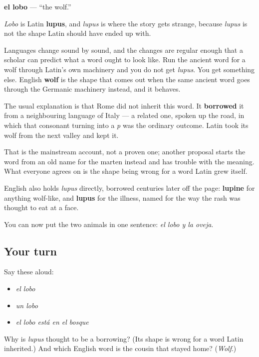 \begin{cousinweb}
\textbf{el lobo} — \textquotedblleft{}the wolf.\textquotedblright{}

\emph{Lobo} is Latin \textbf{lupus}, and \emph{lupus} is where the story gets strange, because \emph{lupus} is not the shape Latin should have ended up with.

Languages change sound by sound, and the changes are regular enough that a scholar can predict what a word ought to look like. Run the ancient word for a wolf through Latin's own machinery and you do not get \emph{lupus}. You get something else. English \textbf{wolf} is the shape that comes out when the same ancient word goes through the Germanic machinery instead, and it behaves.

The usual explanation is that Rome did not inherit this word. It \textbf{borrowed} it from a neighbouring language of Italy — a related one, spoken up the road, in which that consonant turning into a \emph{p} was the ordinary outcome. Latin took its wolf from the next valley and kept it.

That is the mainstream account, not a proven one; another proposal starts the word from an old name for the marten instead and has trouble with the meaning. What everyone agrees on is the shape being wrong for a word Latin grew itself.

English also holds \emph{lupus} directly, borrowed centuries later off the page: \textbf{lupine} for anything wolf-like, and \textbf{lupus} for the illness, named for the way the rash was thought to eat at a face.
\end{cousinweb}

\begin{grammarlens}[title={What you've built}]
You can now put the two animals in one sentence: \emph{el lobo y la oveja}.
\end{grammarlens}

\subsection*{Your turn}
Say these aloud:

\begin{itemize}
\raggedright
  \item \emph{el lobo}
  \item \emph{un lobo}
  \item \emph{el lobo está en el bosque}
\end{itemize}

\begin{tcolorbox}[breakable,colback=teal!4,colframe=teal!35!black,title={Before you move on}]
Why is \emph{lupus} thought to be a borrowing? (Its shape is wrong for a word Latin inherited.) And which English word is the cousin that stayed home? (\emph{Wolf}.)
\end{tcolorbox}
